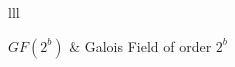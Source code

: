 \documentclass[
11pt, %
english, %
singlespacing, %
headsepline, %
]{MastersDoctoralThesis} %
\theoremstyle{remark}
\begin{document}

%
%
%


\begin{symbols}{lll} %

$GF(2^b)$ & Galois Field of order $2^b$\\
%
%

\end{symbols}




\mainmatter %

\pagestyle{thesis} %

\end{document}
